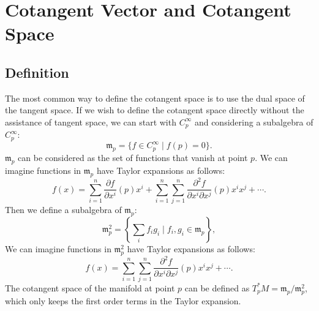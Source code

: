 \documentclass{report}
\begin{document}
\section{Cotangent Vector and Cotangent Space}
\subsection{Definition}
The most common way to define the cotangent space is to use the dual space of the tangent space.
If we wish to define the cotangent space directly without the assistance of tangent space, we can start with $C^\infty_p$ and considering a subalgebra of $C^\infty_p$:
\[
    \mathfrak{m}_p=\{f\in C^\infty_p\mid f(p)=0\}.
\]
$\mathfrak{m}_p$ can be considered as the set of functions that vanish at point $p$. We can imagine functions in $\mathfrak{m}_p$ have Taylor expansions as follows:
\[
    f(x)=\sum_{i=1}^n\frac{\partial f}{\partial x^i}(p)x^i+\sum_{i=1}^n\sum_{j=1}^n\frac{\partial^2 f}{\partial x^i\partial x^j}(p)x^ix^j+\cdots.
\] 
Then we define a subalgebra of $\mathfrak{m}_p$:
\[
    \mathfrak{m}^2_p=\left\{\sum_if_ig_i\mid f_i, g_i\in \mathfrak{m}_p\right\},
\]
We can imagine functions in $\mathfrak{m}_p^2$ have Taylor expansions as follows:
\[
    f(x)=\sum_{i=1}^n\sum_{j=1}^n\frac{\partial^2 f}{\partial x^i\partial x^j}(p)x^ix^j+\cdots.
\] 
The cotangent space of the manifold at point $p$ can be defined as $T_p^*M=\mathfrak{m}_p/\mathfrak{m}^2_p$, which only keeps the first order terms in the Taylor expansion.


\end{document}
